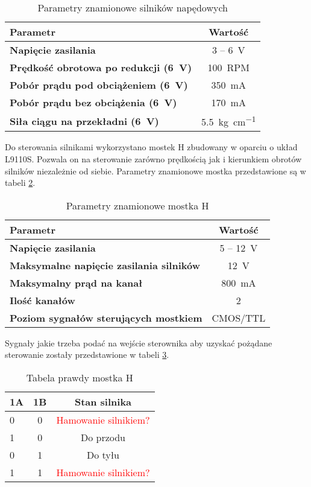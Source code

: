 		\begin{table}[H]
			\centering
			\begin{tabular}{|l|c|} \hline
				\textbf{Parametr} & Wartość \\
				\hline
				\hline  \textbf{Napięcie zasilania}& 3 -- \SI{6}{\volt}  \\
				\hline 	\textbf{Prędkość obrotowa po redukcji (\SI{6}{\volt})}& \SI{100}{RPM} \\
				\hline 	\textbf{Pobór prądu pod obciążeniem (\SI{6}{\volt})}& \SI{350}{\mA} \\
				\hline 	\textbf{Pobór prądu bez obciążenia (\SI{6}{\volt})}& \SI{170}{\mA} \\
				\hline 	\textbf{Siła ciągu na przekładni (\SI{6}{\volt})}& \SI[per-mode=symbol]{5,5}{\kg\per\cm} \\
				\hline
			\end{tabular}
			\caption{Parametry znamionowe silników napędowych}
			\label{tab:Napęd}
		\end{table}
	
		Do sterowania silnikami wykorzystano mostek H zbudowany w oparciu o układ L9110S. Pozwala on na sterowanie zarówno prędkością jak i kierunkiem obrotów silników niezależnie od siebie. Parametry znamionowe mostka przedstawione są w tabeli \ref{tab:MostekH}.
		
		\begin{table}[H]
			\centering
			\begin{tabular}{|l|c|} \hline
				\textbf{Parametr} & Wartość \\
				\hline
				\hline  \textbf{Napięcie zasilania}& 5 -- \SI{12}{\volt}  \\
				\hline 	\textbf{Maksymalne napięcie zasilania silników} & \SI{12}{\volt} \\
				\hline 	\textbf{Maksymalny prąd na kanał}& \SI{800}{\mA} \\
				\hline 	\textbf{Ilość kanałów}& 2 \\
				\hline 	\textbf{Poziom sygnałów sterujących mostkiem}& CMOS/TTL \\
				\hline
			\end{tabular}
			\caption{Parametry znamionowe mostka H}
			\label{tab:MostekH}
		\end{table}
	
		Sygnały jakie trzeba podać na wejście sterownika aby uzyskać pożądane sterowanie zostały przedstawione w tabeli \ref{tab:tabelaPrawdyMostkaH}.
		
		\begin{table}[H]
			\centering
			\begin{tabular}{|l|c|c|} \hline
				\textbf{1A} & 1B & Stan silnika \\
				\hline
				\hline 	0 & 0 & \textcolor{red}{Hamowanie silnikiem?}\\
				\hline 	1	& 0 & Do przodu \\
				\hline 	0 & 1 & Do tyłu \\
				\hline 	1 & 1 & \textcolor{red}{Hamowanie silnikiem?} \\
				\hline
			\end{tabular}
			\caption{Tabela prawdy mostka H}
			\label{tab:tabelaPrawdyMostkaH}
		\end{table}
		
